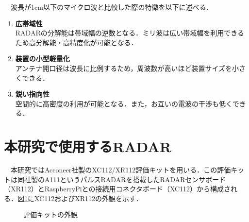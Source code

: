 　波長が1cm以下のマイクロ波と比較した際の特徴を以下に述べる\cite{feature_RadioWaves}．
\begin{enumerate}
    \item \textbf{広帯域性}\\
        RADARの分解能は帯域幅の逆数となる．ミリ波は広い帯域幅を利用できるため高分解能・高精度化が可能となる．
    \item \textbf{装置の小型軽量化}\\
        アンテナ開口径は波長に比例するため，周波数が高いほど装置サイズを小さくできる．
    \item \textbf{鋭い指向性}\\
        空間的に高密度の利用が可能となる．また，お互いの電波の干渉も低くできる．
\end{enumerate}

\section{本研究で使用するRADAR}
　本研究ではAcconeer社製のXC112/XR112評価キットを用いる．この評価キットは同社製のA111というパルスRADARを搭載したRADARセンサボード（XR112）とRaspberryPiとの接続用コネクタボード（XC112）から構成される．図\ref{fig:EVK_Img}にXC112およびXR112の外観を示す．
\begin{figure}[H]
    \centering
    \caption{評価キットの外観}
    \label{fig:EVK_Img}
\end{figure}

